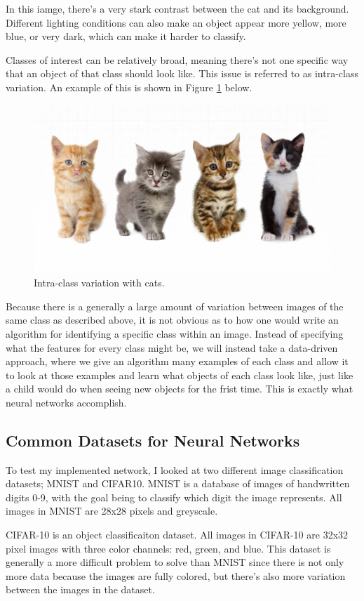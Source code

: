 \noindent In this iamge, there's a very stark contrast between the cat and its
background.  Different lighting conditions can also make an object appear more
yellow, more blue, or very dark, which can make it harder to classify.

\noindent Classes of interest can be relatively broad, meaning there's not one
specific way that an object of that class should look like.  This issue is
referred to as intra-class variation. An example of this is shown in Figure
\ref{fig:intra_class_variation} below.

\begin{figure}[ht!] \centering
\includegraphics[height=2.5in]{../figures/kitty_intra_class_variation.jpg}
\caption{Intra-class variation with cats.} \label{fig:intra_class_variation}
\end{figure}

\noindent Because there is a generally a large amount of variation between
images of the same class as described above, it is not obvious as to how one
would write an algorithm for identifying a specific class within an image.
Instead of specifying what the features for every class might be, we will
instead take a data-driven approach, where we give an algorithm many examples
of each class and allow it to look at those examples and learn what objects of
each class look like, just like a child would do when seeing new objects for
the frist time. This is exactly what neural networks accomplish.

\subsection{Common Datasets for Neural Networks}
To test my implemented network, I looked at two different image classification
datasets; MNIST and CIFAR10. MNIST is a database of images of handwritten
digits 0-9, with the goal being to classify which digit the image represents.
All images in MNIST are 28x28 pixels and greyscale.

CIFAR-10 is an object classificaiton dataset. All images in CIFAR-10 are 32x32
pixel images with three color channels: red, green, and blue. This dataset is
generally a more difficult problem to solve than MNIST since there is not only
more data because the images are fully colored, but there's also more variation
between the images in the dataset.

